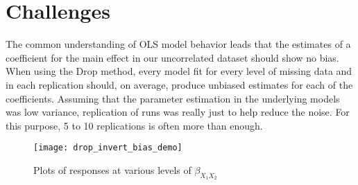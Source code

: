 \documentclass[../paper.tex]{subfiles}
\begin{document}
\section{Challenges}
The common understanding of OLS model behavior leads that the estimates
of a coefficient for the main effect in our uncorrelated dataset should show no bias.
When using the Drop method, every model fit for every level of missing data and in each replication should, on average, produce unbiased estimates for each of the coefficients.
Assuming that the parameter estimation in the underlying models was low variance,
replication of runs was really just to help reduce the noise. For this purpose, 5 to 10 replications is often more than enough.

\begin{figure}[H]

\centering
\texttt{[image: drop\_invert\_bias\_demo]}
\caption{Plots of responses at various levels of $\beta_{X_{1}X_{2}}$}
\label{fig:drop_invert_bias_demo}
\end{figure}


\end{document}
